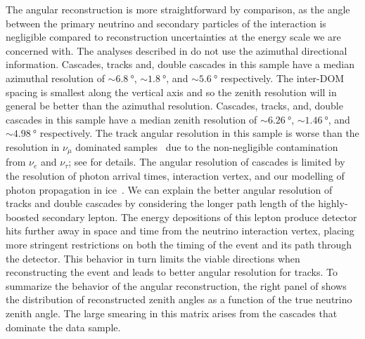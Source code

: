 The angular reconstruction is more straightforward by comparison, as the angle between the primary neutrino and secondary particles of the interaction is negligible compared to reconstruction uncertainties at the energy scale we are concerned with.
The analyses described in  do not use the azimuthal directional information.
Cascades, tracks and, double cascades in this sample have a median azimuthal resolution of $\sim\SI{6.8}\degree$, $\sim\SI{1.8}\degree$, and $\sim\SI{5.6}\degree$ respectively.
The inter-DOM spacing is smallest along the vertical axis and so the zenith resolution will in general be better than the azimuthal resolution.
Cascades, tracks, and, double cascades in this sample have a median zenith resolution of $\sim\SI{6.26}\degree$, $\sim\SI{1.46}\degree$, and $\sim\SI{4.98}\degree$ respectively.
The track angular resolution in this sample is worse than the resolution in $\nu_\mu$ dominated samples~\cite{Stettner:2019tok} due to the non-negligible contamination from $\nu_e$ and $\nu_\tau$; see  for details.
The angular resolution of cascades is limited by the resolution of photon arrival times, interaction vertex, and our modelling of photon propagation in ice~\cite{Aartsen:2013rt,Aartsen:2016nxy}.
We can explain the better angular resolution of tracks and double cascades by considering the longer path length of the highly-boosted secondary lepton.
The energy depositions of this lepton produce detector hits further away in space and time from the neutrino interaction vertex, placing more stringent restrictions on both the timing of the event and its path through the detector.
This behavior in turn limits the viable directions when reconstructing the event and leads to better angular resolution for tracks.
To summarize the behavior of the angular reconstruction, the right panel of  shows the distribution of reconstructed zenith angles as a function of the true neutrino zenith angle.
The large smearing in this matrix arises from the cascades that dominate the data sample.

